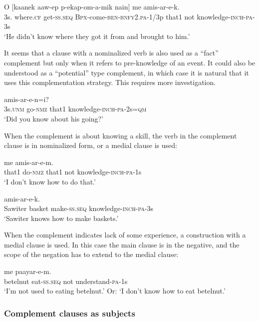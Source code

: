 \ea%
\label{ex:8:x1602}
\gll O  [kaanek  aaw-ep  p-ekap-om-a-mik nain]  me  amis-ar-e-k.\\
3s.   where.\textsc{cf} get-\textsc{ss}.\textsc{seq} \textsc{Bpx}-come-\textsc{ben}-\textsc{bnfy}2.\textsc{pa}-1/3p that1  not  knowledge-\textsc{inch}-\textsc{pa}-3s\\
\glt`He didn't know where they got it from and brought to him.'
\z


It seems that a clause with a nominalized verb is also used as a ``fact'' complement but only when it refers to pre-knowledge of an event. It could also be understood as a ``potential'' type complement, in which case it is natural that it uses this complementation strategy. This requires more investigation. 

\ea%
\label{ex:8:x1605}
  amis-ar-e-n=i? \\
3s.\textsc{unm} go-\textsc{nmz} that1 knowledge-\textsc{inch}-\textsc{pa}-2s=\textsc{qm}\\
\glt`Did you know about his going?'
\z


When the complement is about knowing a skill, the verb in the complement clause is in nominalized form, or a medial clause is used: 

\ea%
\label{ex:8:x1603}
  me  amis-ar-e-m.\\
that1  do-\textsc{nmz} that1 not knowledge-\textsc{inch}-\textsc{pa}-1s\\
\glt`I don't know how to do that.'
\z


\ea%
\label{ex:8:x1849}
  amis-ar-e-k.\\
Sawiter  basket  make-\textsc{ss}.\textsc{seq} knowledge-\textsc{inch}-\textsc{pa}-3s\\
\glt`Sawiter knows how to make baskets.'
\z


When the complement indicates lack of some experience, a construction with a medial clause is used. In this case the main clause is in the negative, and the scope of the negation has to extend to the medial clause:

\ea%
\label{ex:8:x1604}
\gll [Owora  en-ep]  me  paayar-e-m.\\
betelnut  eat-\textsc{ss}.\textsc{seq} not understand-\textsc{pa}-1s\\
\glt`I'm not used to eating betelnut.' Or: `I don't know how to eat betelnut.'
\z


\subsubsection{Complement clauses as subjects}

